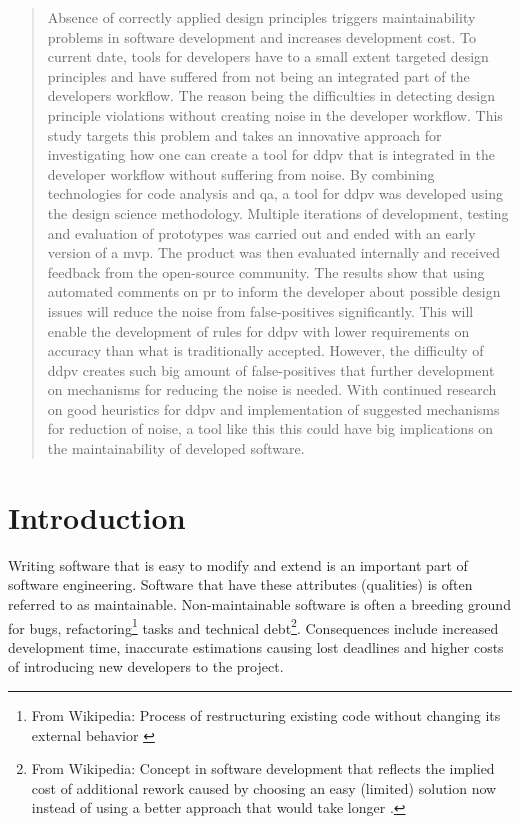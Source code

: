 \documentclass[pdftex,10pt,b5paper,twoside]{report}
\begin{document}
\begin{abstract}
	Absence of correctly applied design principles triggers maintainability problems in software development and increases development cost. To current date, tools for developers have to a small extent targeted design principles and have suffered from not being an integrated part of the developers workflow. The reason being the difficulties in detecting design principle violations without creating noise in the developer workflow. This study targets this problem and takes an innovative approach for investigating how one can create a tool for \gls{ddpv} that is integrated in the developer workflow without suffering from noise. By combining technologies for code analysis and \gls{qa}, a tool for \gls{ddpv} was developed using the design science methodology. Multiple iterations of development, testing and evaluation of prototypes was carried out and ended with an early version of a \acrfull{mvp}. The product was then evaluated internally and received feedback from the open-source community. The results show that using automated comments on \gls{pr} to inform the developer about possible design issues will reduce the noise from false-positives significantly. This will enable the development of rules for \gls{ddpv} with lower requirements on accuracy than what is traditionally accepted. However, the difficulty of \gls{ddpv} creates such big amount of false-positives that further development on mechanisms for reducing the noise is needed. With continued research on good heuristics for \gls{ddpv} and implementation of suggested mechanisms for reduction of noise, a tool like this this could have big implications on the maintainability of developed software. 
	
\end{abstract}
\clearpage



\tableofcontents

\cleardoublepage
\chapter{Introduction}




Writing software that is easy to modify and extend is an important part of software engineering. Software that have these attributes (qualities) is often referred to as maintainable. Non-maintainable software is often a breeding ground for bugs, refactoring\footnote{From Wikipedia: Process of restructuring existing code without changing its external behavior \cite{refactoring}} tasks and technical debt\footnote{From Wikipedia: Concept in software development that reflects the implied cost of additional rework caused by choosing an easy (limited) solution now instead of using a better approach that would take longer \cite{technicalDebt}.}. Consequences include increased development time, inaccurate estimations causing lost deadlines and higher costs of introducing new developers to the project.
\end{document}
